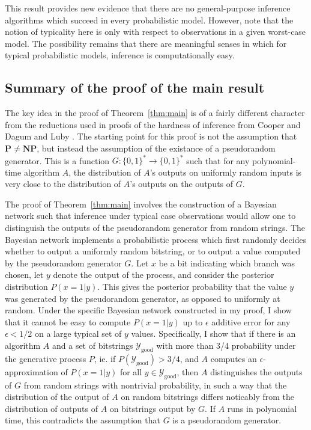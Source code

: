 \documentclass{article}
\renewcommand{\P}{\mathbf{P}}
\newcommand{\NP}{\mathbf{NP}}
\def \Ygood{\mathcal{Y}_\text{good}}
\theoremstyle{definition}
\theoremstyle{remark}
\begin{document}
This result provides new evidence that there are no general-purpose inference algorithms which succeed in every probabilistic model.
However, note that the notion of typicality here is only with respect to observations in a given worst-case model.
The possibility remains that there are meaningful senses in which for typical probabilistic models, inference is computationally easy.

\subsection{Summary of the proof of the main result}
The key idea in the proof of Theorem~\ref{thm:main} is of a fairly different character from the reductions used in proofs of the hardness of inference from Cooper \cite{cooper1990} and Dagum and Luby \cite{dagum1993}.
The starting point for this proof is not the assumption that $\P \neq \NP$, but instead the assumption of the existance of a pseudorandom generator.
This is a function $G: \{0, 1\}^* \to \{0, 1\}^*$ such that for any polynomial-time algorithm $A$, the distribution of $A$'s outputs on uniformly random inputs is very close to the distribution of $A$'s outputs on the outputs of $G$.

The proof of Theorem~\ref{thm:main} involves the construction of a Bayesian network such that inference under typical case observations would allow one to distinguish the outputs of the pseudorandom generator from random strings.
The Bayesian network implements a probabilistic process which first randomly decides whether to output a uniformly random bitstring, or to output a value computed by the pseudorandom generator $G$.
Let $x$ be a bit indicating which branch was chosen,
let $y$ denote the output of the process,
and consider the posterior distribution $P(x = 1 | y)$.
This gives the posterior probability that the value $y$ was generated by the pseudorandom generator, as opposed to uniformly at random.
Under the specific Bayesian network constructed in my proof, I show that it cannot be easy to compute $P(x = 1 | y)$ up to $\epsilon$ additive error for any $\epsilon < 1/2$ on a large typical set of $y$ values.
Specifically, I show that if there is an algorithm $A$ and a set of bitstrings
$\Ygood$ with more than 3/4 probability under the generative process $P$,
ie. if 
$P(\Ygood) > 3/4$,
and $A$ computes an $\epsilon$-approximation of $P(x = 1 | y)$
for all $y \in \Ygood$,
then $A$ distinguishes the outputs of $G$ from random strings with nontrivial probability, in such a way that the distribution of the output of $A$ on random bitstrings differs noticably from the distribution of outputs of $A$ on bitstrings output by $G$.
If $A$ runs in polynomial time, this contradicts the assumption that $G$ is a pseudorandom generator.
\end{document}
